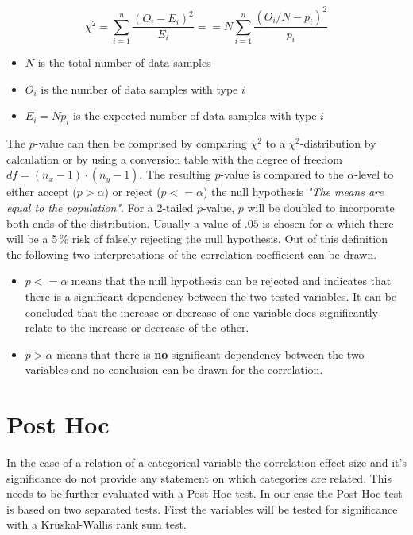
\begin{equation}
\label{formula_chi_squared_simplified}	
	\chi^2 = \sum_{i=1}^{n}{\frac{(O_i-E_i)^2}{E_i}} == N\sum_{i=1}^{n}{\frac{(O_i/N-p_i)^2}{p_i}}
\end{equation}
\begin{itemize}
	\setlength\itemsep{0.1em}	
	\item[] $N$ is the total number of data samples 
	\item[] $O_i$ is the number of data samples with type $i$
	\item[] $E_i = N p_i$ is the expected number of data samples with type $i$
\end{itemize}

\medskip

The $p$-value can then be comprised by comparing $\chi^2$ to a $\chi^2$-distribution by calculation or by using a conversion table \parencite{Piegorsch2002} with the degree of freedom $df = (n_x - 1) \cdot (n_y - 1)$. The resulting  $p$-value is compared to the $\alpha$-level to either accept ($p > \alpha$) or reject ($p <= \alpha$) the null hypothesis \textit{"The means are equal to the population"}. For a 2-tailed $p$-value, $p$ will be doubled to incorporate both ends of the distribution. Usually a value of $.05$ is chosen for $\alpha$ which there will be a 5\,\% risk of falsely rejecting the null hypothesis. Out of this definition the following two interpretations of the correlation coefficient can be drawn. \parencite{Tenny2020,OTSD2020}

\begin{itemize}
	\item $p <= \alpha$ means that the null hypothesis can be rejected and indicates that there is a significant dependency between the two tested variables. It can be concluded that the increase or decrease of one variable does significantly relate to the increase or decrease of the other.
	\item $p > \alpha$ means that there is \textbf{no} significant dependency between the two variables and no conclusion can be drawn for the correlation.
\end{itemize}

\section{Post Hoc}
\label{correlation_posthoc}
In the case of a relation of a categorical variable the correlation effect size and it's significance do not provide any statement on which categories are related. This needs to be further evaluated with a Post Hoc test. In our case the Post Hoc test is based on two separated tests. First the variables will be tested for significance with a Kruskal-Wallis rank sum test. 

